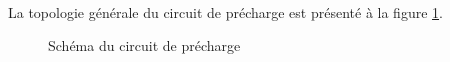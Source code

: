 		\paragraph*{}			
		La topologie générale du circuit de précharge est présenté à la figure \ref{fig:circuitprecharge}.
				
		\begin{figure}[H]
			\centering
			\caption[]{Schéma du circuit de précharge}
			\label{fig:circuitprecharge}
		\end{figure}
			
		